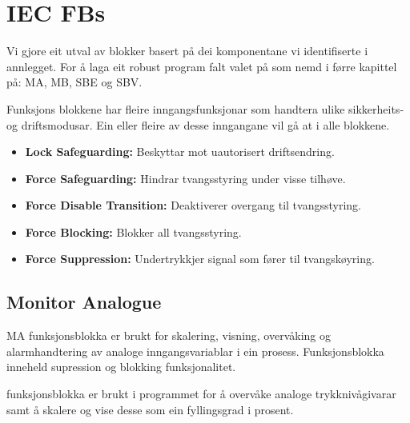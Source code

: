 \section{IEC \glspl{FB}}
\thispagestyle{fancy}



Vi gjore eit utval av blokker basert på dei komponentane vi identifiserte i annlegget.
For å laga eit robust program falt valet på som nemd i førre kapittel på: \gls{MA}, \gls{MB}, \gls{SBE} og \gls{SBV}.

Funksjons blokkene har fleire inngangsfunksjonar som handtera ulike sikkerheits- og driftsmodusar.
Ein eller fleire av desse inngangane vil gå at i alle blokkene.
\begin{itemize}
    \item \textbf{Lock Safeguarding:} Beskyttar mot uautorisert driftsendring.
    \item \textbf{Force Safeguarding:} Hindrar tvangsstyring under visse tilhøve.
    \item \textbf{Force Disable Transition:} Deaktiverer overgang til tvangsstyring.
    \item \textbf{Force Blocking:} Blokker all tvangsstyring.
    \item \textbf{Force Suppression:} Undertrykkjer signal som fører til tvangskøyring.
\end{itemize}

\subsection{Monitor Analogue}
\gls{MA} funksjonsblokka er brukt for skalering, visning, overvåking og alarmhandtering av analoge inngangsvariablar i ein prosess.
Funksjonsblokka inneheld supression og blokking funksjonalitet.

funksjonsblokka er brukt i programmet for å overvåke analoge trykknivågivarar samt å skalere og vise desse som ein fyllingsgrad i prosent.

